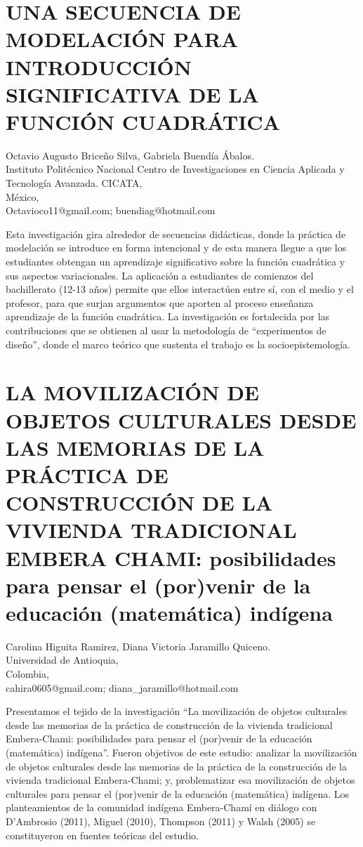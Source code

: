\section{UNA SECUENCIA DE MODELACIÓN PARA INTRODUCCIÓN SIGNIFICATIVA DE LA
FUNCIÓN CUADRÁTICA}

\begin{datos}
Octavio Augusto Briceño Silva, Gabriela Buendía Ábalos.\\
Instituto Politécnico Nacional Centro de Investigaciones en Ciencia Aplicada y Tecnología Avanzada. CICATA,\\
México,\\
\hfill  Octavioco11@gmail.com; buendiag@hotmail.com 
\end{datos}

Esta investigación gira alrededor de secuencias didácticas, donde
la práctica de modelación se introduce en forma intencional y de esta
manera llegue a que los estudiantes obtengan un aprendizaje significativo
sobre la función cuadrática y sus aspectos variacionales. La aplicación
a estudiantes de comienzos del bachillerato (12-13 años) permite que
ellos interactúen entre sí, con el medio y el profesor, para que surjan
argumentos que aporten al proceso enseñanza aprendizaje de la función
cuadrática. La investigación es fortalecida por las contribuciones
que se obtienen al usar la metodología de “experimentos de diseño”,
donde el marco teórico que sustenta el trabajo es la socioepistemología.


\section{LA MOVILIZACIÓN DE OBJETOS CULTURALES DESDE LAS MEMORIAS DE LA PRÁCTICA
DE CONSTRUCCIÓN DE LA VIVIENDA TRADICIONAL EMBERA CHAMI: posibilidades
para pensar el (por)venir de la educación (matemática) indígena}

\begin{datos}
Carolina Higuita Ramirez, Diana Victoria Jaramillo Quiceno.\\
Universidad de Antioquia,\\
Colombia,\\
\hfill  cahira0605@gmail.com; diana\_{}jaramillo@hotmail.com 
\end{datos}

Presentamos el tejido de la investigación “La movilización de objetos
culturales desde las memorias de la práctica de construcción de la
vivienda tradicional Embera-Chami: posibilidades para pensar el (por)venir
de la educación (matemática) indígena”. Fueron objetivos de este estudio:
analizar la movilización de objetos culturales desde las memorias
de la práctica de la construcción de la vivienda tradicional Embera-Chami;
y, problematizar esa movilización de objetos culturales para pensar
el (por)venir de la educación (matemática) indígena. Los planteamientos
de la comunidad indígena Embera-Chamí en diálogo con D’Ambrosio (2011),
Miguel (2010), Thompson (2011) y Walsh (2005) se constituyeron en
fuentes teóricas del estudio.


